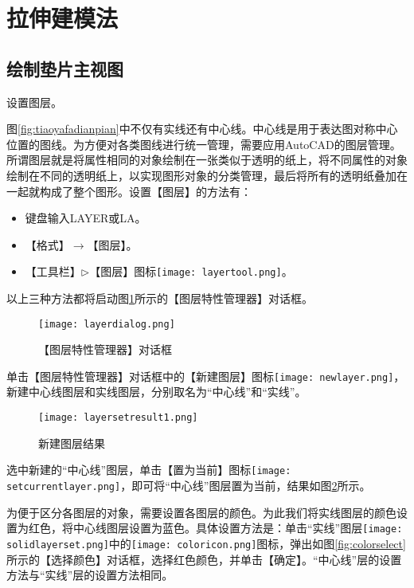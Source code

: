 \section{拉伸建模法}
\subsection{绘制垫片主视图}\label{sec:dianpian}
\begin{procedure}
\item 设置图层。

图\ref{fig:tiaoyafadianpian}中不仅有实线还有中心线。中心线是用于表达图对称中心位置的图线。为方便对各类图线进行统一管理，需要应用AutoCAD的图层管理。所谓图层就是将属性相同的对象绘制在一张类似于透明的纸上，将不同属性的对象绘制在不同的透明纸上，以实现图形对象的分类管理，最后将所有的透明纸叠加在一起就构成了整个图形。设置【图层】的方法有：
\begin{itemize}
\item 键盘输入LAYER或LA。
\item 【格式】$\rightarrow$【图层】。
\item 【工具栏】$\triangleright$【图层】图标\texttt{[image: layertool.png]}。
\end{itemize}
以上三种方法都将启动图\ref{fig:layerdialog}所示的【图层特性管理器】对话框。
\begin{figure}[htbp]
\centering
\texttt{[image: layerdialog.png]}
\caption{【图层特性管理器】对话框}\label{fig:layerdialog}
\end{figure}

单击【图层特性管理器】对话框中的【新建图层】图标\texttt{[image: newlayer.png]}，新建中心线图层和实线图层，分别取名为“中心线”和“实线”。

\begin{figure}[htbp]
\centering
\texttt{[image: layersetresult1.png]}
\caption{新建图层结果}\label{fig:layersetresult1}
\end{figure}

选中新建的“中心线”图层，单击【置为当前】图标\texttt{[image: setcurrentlayer.png]}，即可将“中心线”图层置为当前，结果如图\ref{fig:layersetresult1}所示。

为便于区分各图层的对象，需要设置各图层的颜色。为此我们将实线图层的颜色设置为红色，将中心线图层设置为蓝色。具体设置方法是：单击“实线”图层\texttt{[image: solidlayerset.png]}中的\texttt{[image: coloricon.png]}图标，弹出如图\ref{fig:colorselect}所示的【选择颜色】对话框，选择红色颜色，并单击【确定】。“中心线”层的设置方法与“实线”层的设置方法相同。


\end{procedure}
